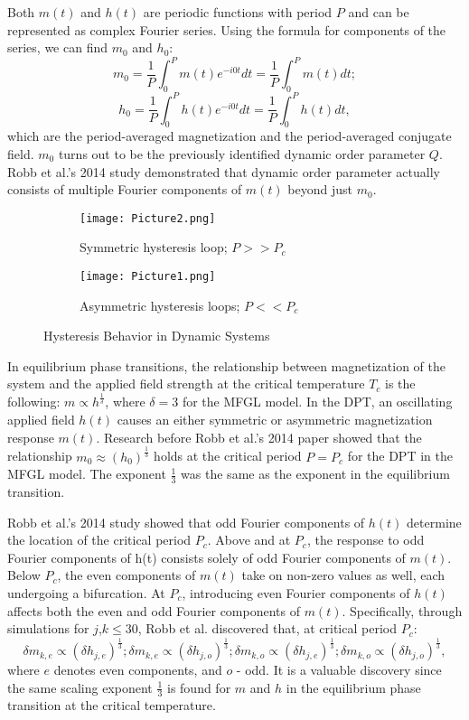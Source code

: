 \documentclass{article}
\begin{document}
Both $m(t)$ and $h(t)$ are periodic functions with period $P$ and can be represented as complex Fourier series. Using the formula for components of the series, we can find $m_0$ and $h_0$:
\[m_0=\frac{1}{P} \int_0^Pm (t) e^{-i0t} dt=\frac{1}{P}\int_0^Pm (t)dt;\]
\[h_0=\frac{1}{P}\int_0^Ph (t) e^{-i0t} dt=\frac{1}{P}\int_0^Ph (t)dt,\]
which are the period-averaged magnetization and the period-averaged conjugate field. $m_0$ turns out to be the previously identified dynamic order parameter $Q$. Robb et al.’s 2014 study demonstrated that dynamic order parameter actually consists of multiple Fourier components of $m(t)$ beyond just $m_0$.
 
\begin{figure}[htbp]
  \centering
  \begin{subfigure}{0.48\textwidth}
    \centering
    \texttt{[image: Picture2.png]}
    \caption{Symmetric hysteresis loop; $P>>P_c$}
    \label{fig:left}
  \end{subfigure}\hfill
  \begin{subfigure}{0.48\textwidth}
    \centering
    \texttt{[image: Picture1.png]}
    \caption{Asymmetric hysteresis loops; $P <<P_c$}
    \label{fig:right}
  \end{subfigure}
  \caption{Hysteresis Behavior in Dynamic Systems}
  \label{fig:side-by-side}
\end{figure}
In equilibrium phase transitions, the relationship between magnetization of the system and the applied field strength at the critical temperature $T_c$ is the following: $m\propto h^{\frac{1}{\delta}}$,
where $\delta=3$ for the MFGL model. In the DPT, an oscillating applied field $h(t)$ causes an either symmetric or asymmetric magnetization response $m(t)$. Research before Robb et al.’s 2014 paper showed that the relationship $m_0\approx(h_0 )^\frac{1}{3}$ holds at the critical period $P=P_c$ for the DPT in the MFGL model. The exponent $\frac{1}{3}$ was the same as the exponent in the equilibrium transition. 

Robb et al.’s 2014 study showed that odd Fourier components of $h(t)$ determine the location of the critical period $P_c$. Above and at $P_c$, the response to odd Fourier components of h(t) consists solely of odd Fourier components of $m(t)$. Below $P_c$, the even components of $m(t)$ take on non-zero values as well, each undergoing a bifurcation. At $P_c$, introducing even Fourier components of $h(t)$ affects both the even and odd Fourier components of $m(t)$. Specifically, through simulations for $j$,$k\leq 30$, Robb et al. discovered that, at critical period $P_c$:
\[\delta m_{k,e}\propto (\delta h_{j,e} )^\frac{1}{3};\delta m_{k,e}\propto(\delta h_{j,o} )^\frac{1}{3};\delta m_{k,o}\propto (\delta h_{j,e}) ^\frac{1}{3};\delta m_{k,o}\propto(\delta h_{j,o} )^\frac{1}{3},\]
where $e$ denotes even components, and $o$ - odd. It is a valuable discovery since the same scaling exponent $\frac{1}{3}$ is found for $m$ and $h$ in the equilibrium phase transition at the critical temperature.
\end{document}
